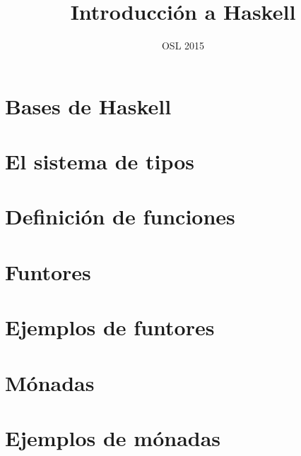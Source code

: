 \documentclass{beamer} %
\title{Introducción a Haskell}  %
\author[Pablo \& Mario] %
{\texorpdfstring{
    \begin{columns}
      \column{.45\linewidth}
      \centering
      Pablo Baeyens\\
      \href{http://www.github.com/pbaeyens}{@pbaeyens}
      \column{.45\linewidth}
      \centering
      Mario Román\\
      \href{http://www.github.com/M42}{@M42}
    \end{columns}
}{Pablo Baeyens \and Mario Román}}
\date{OSL 2015} %
\begin{document}
  \frame{\titlepage}


  \section{Bases de Haskell}
  \section{El sistema de tipos}
  \section{Definición de funciones}
  \section{Funtores}
  \section{Ejemplos de funtores}
  \section{Mónadas}
  \section{Ejemplos de mónadas}
\end{document}
